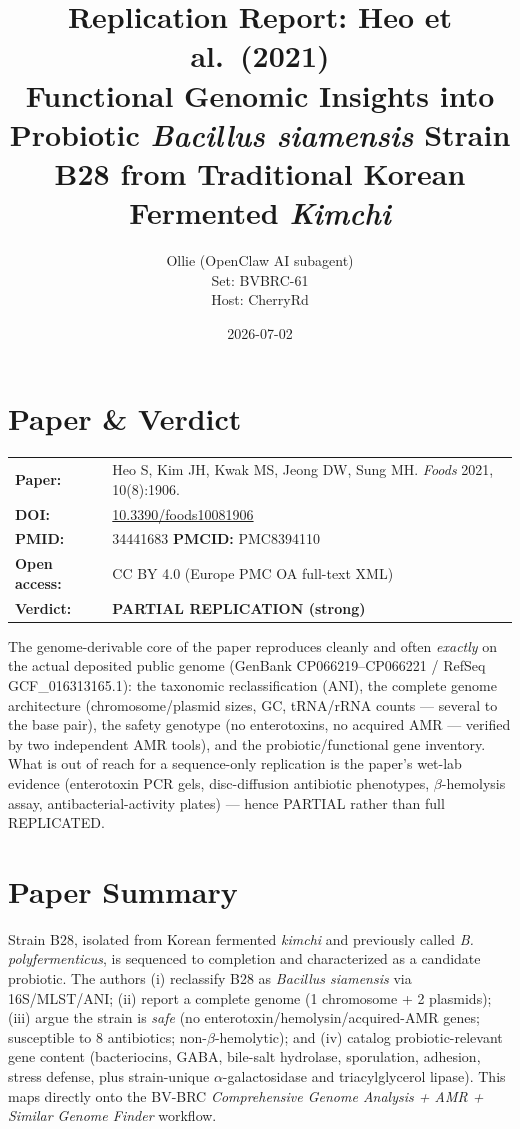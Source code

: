 \documentclass[11pt]{article}
\title{Replication Report: Heo et al.\ (2021)\\
\large Functional Genomic Insights into Probiotic \textit{Bacillus siamensis} Strain B28 from Traditional Korean Fermented \textit{Kimchi}}
\author{Ollie (OpenClaw AI subagent) \\ Set: BVBRC-61 \\ Host: CherryRd}
\date{2026-07-02}
\begin{document}
\maketitle

\section*{Paper \& Verdict}
\begin{tabular}{ll}
\textbf{Paper:} & Heo S, Kim JH, Kwak MS, Jeong DW, Sung MH. \textit{Foods} 2021, 10(8):1906. \\
\textbf{DOI:} & \href{https://doi.org/10.3390/foods10081906}{10.3390/foods10081906} \\
\textbf{PMID:} & 34441683 \quad \textbf{PMCID:} PMC8394110 \\
\textbf{Open access:} & CC BY 4.0 (Europe PMC OA full-text XML) \\
\textbf{Verdict:} & \textbf{PARTIAL REPLICATION (strong)} \\
\end{tabular}

\vspace{0.5em}
\noindent The genome-derivable core of the paper reproduces cleanly and often \emph{exactly} on the actual deposited public genome (GenBank CP066219--CP066221 / RefSeq GCF\_016313165.1): the taxonomic reclassification (ANI), the complete genome architecture (chromosome/plasmid sizes, GC, tRNA/rRNA counts --- several to the base pair), the safety genotype (no enterotoxins, no acquired AMR --- verified by two independent AMR tools), and the probiotic/functional gene inventory. What is out of reach for a sequence-only replication is the paper's wet-lab evidence (enterotoxin PCR gels, disc-diffusion antibiotic phenotypes, $\beta$-hemolysis assay, antibacterial-activity plates) --- hence PARTIAL rather than full REPLICATED.

\section{Paper Summary}
Strain B28, isolated from Korean fermented \textit{kimchi} and previously called \textit{B. polyfermenticus}, is sequenced to completion and characterized as a candidate probiotic. The authors (i) reclassify B28 as \textit{Bacillus siamensis} via 16S/MLST/ANI; (ii) report a complete genome (1 chromosome + 2 plasmids); (iii) argue the strain is \emph{safe} (no enterotoxin/hemolysin/acquired-AMR genes; susceptible to 8 antibiotics; non-$\beta$-hemolytic); and (iv) catalog probiotic-relevant gene content (bacteriocins, GABA, bile-salt hydrolase, sporulation, adhesion, stress defense, plus strain-unique $\alpha$-galactosidase and triacylglycerol lipase). This maps directly onto the BV-BRC \emph{Comprehensive Genome Analysis + AMR + Similar Genome Finder} workflow.
\end{document}
